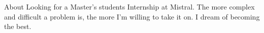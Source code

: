 \begin{rubric}{About}
\noentry{~}
\entry*[Profile]
Looking for a Master's students Internship at Mistral. The more complex and difficult a problem is, the more I'm willing to take it on. I dream of becoming the best.\end{rubric}

